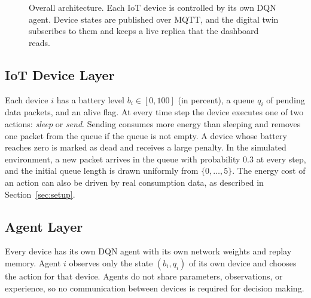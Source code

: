 \documentclass[conference]{IEEEtran}
\begin{document}
\begin{figure}[t]
\centering
{}
\caption{Overall architecture. Each IoT device is controlled by its own DQN agent. Device states are published over MQTT, and the digital twin subscribes to them and keeps a live replica that the dashboard reads.}
\label{fig:arch}
\end{figure}

\subsection{IoT Device Layer}
Each device $i$ has a battery level $b_i \in [0,100]$ (in percent), a queue $q_i$ of pending data packets, and an alive flag. At every time step the device executes one of two actions: \emph{sleep} or \emph{send}. Sending consumes more energy than sleeping and removes one packet from the queue if the queue is not empty. A device whose battery reaches zero is marked as dead and receives a large penalty. In the simulated environment, a new packet arrives in the queue with probability $0.3$ at every step, and the initial queue length is drawn uniformly from $\{0,\dots,5\}$. The energy cost of an action can also be driven by real consumption data, as described in Section~\ref{sec:setup}.

\subsection{Agent Layer}
Every device has its own DQN agent with its own network weights and replay memory. Agent $i$ observes only the state $(b_i, q_i)$ of its own device and chooses the action for that device. Agents do not share parameters, observations, or experience, so no communication between devices is required for decision making.
\end{document}
